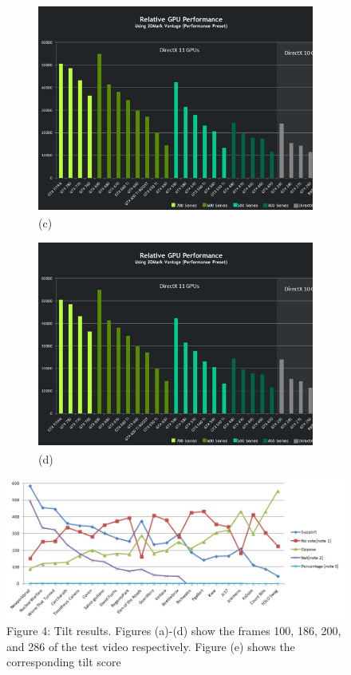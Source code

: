 \documentclass{sig-alternate}
\begin{document}
\begin{figure}[t!]
\begin{subfigure}[b]{0.2\linewidth}
    \includegraphics[width=\linewidth]{Performance.png}
    \caption{(c)}
  \end{subfigure}
  \begin{subfigure}[b]{0.2\linewidth}
    \includegraphics[width=\linewidth]{Performance.png}
    \caption{(d)}
  \end{subfigure}
  \includegraphics[width=\textwidth]{Graph_1.png}
  \caption{Figure 4: Tilt results. Figures (a)-(d) show the frames 100, 186,
200, and 286 of the test video respectively. Figure (e) shows the
corresponding tilt score}
\end{figure}
\end{document}
